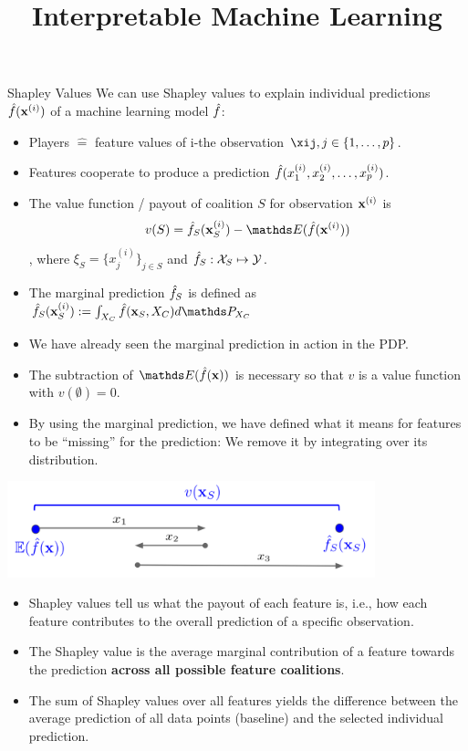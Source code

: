 \documentclass[11pt,compress,t,notes=noshow, xcolor=table]{beamer}
\title{Interpretable Machine Learning}
\institute{\href{https://compstat-lmu.github.io/lecture_i2ml/}{compstat-lmu.github.io/lecture\_i2ml}}
\date{}
\begin{document}

\begin{vbframe}{Shapley Values}
  We can use Shapley values to explain individual predictions $\fh(\xi)$ of a machine learning model $\fh$:
\begin{itemize}
  \item Players $\hat{=}$ feature values of i-the observation $\xij, j \in \pset$.
  \item Features cooperate to produce a prediction $\fh(x^{(i)}_1, x^{(i)}_2, \ldots, x^{(i)}_p)$.
  \item The value function / payout of coalition $S$ for observation $\xv^{(i)}$ is
    $$v(S) =  \fh_{S} (\xi_S) - \E (\fh(\xi))$$, 
    where $\xi_S = \{x_j^{(i)}\}_{j \in S}$ and $\fh_S: \Xspace_S \mapsto \Yspace$.
\item The marginal prediction $\fh_S$ is defined as $\fh_{S}(\xv_S^{(i)}) := \int_{X_C} \fh(\xv_S, X_C)d \P_{X_C}$
\item We have already seen the marginal prediction in action in the PDP.
\item The subtraction of $\E(\fh(\xv))$ is necessary so that $v$ is a value function with $v(\emptyset) = 0$.
\item By using the marginal prediction, we have defined what it means for features to be \enquote{missing} for the prediction: We remove it by integrating over its distribution.
\end{itemize}
\begin{center}
\vspace{-0.3cm}
\includegraphics[width=0.8\textwidth]{figure_man/shapley_valuefct}
\end{center}

\begin{itemize}
 \item Shapley values tell us what the payout of each feature is, i.e., how each feature contributes to the overall prediction of a specific observation.
    \item The Shapley value is the average marginal contribution of a feature towards the prediction \textbf{across all possible feature coalitions}.
    \item The sum of Shapley values over all features yields the difference between the average prediction of all data points (baseline) and the selected individual prediction.
  \end{itemize}
\end{vbframe}
\end{document}
